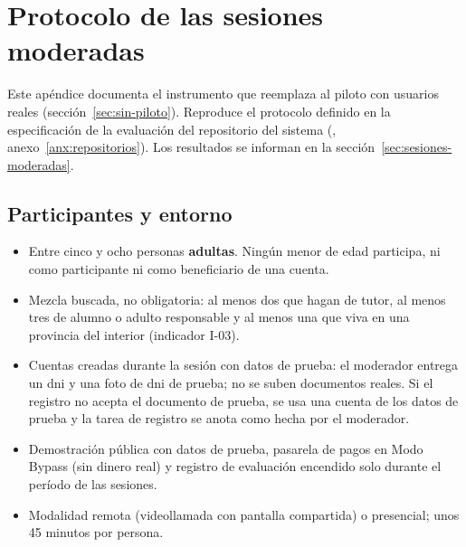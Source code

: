 
\chapter{Protocolo de las sesiones moderadas}\label{apx:sesiones}

Este apéndice documenta el instrumento que reemplaza al piloto con
usuarios reales (sección~\ref{sec:sin-piloto}). Reproduce el protocolo
definido en la especificación de la evaluación del repositorio del
sistema (,
anexo~\ref{anx:repositorios}). Los resultados se informan en la
sección~\ref{sec:sesiones-moderadas}.

\section{Participantes y entorno}

\begin{itemize}
    \item Entre cinco y ocho personas \textbf{adultas}. Ningún menor de
          edad participa, ni como participante ni como beneficiario de
          una cuenta.
    \item Mezcla buscada, no obligatoria: al menos dos que hagan de
          tutor, al menos tres de alumno o adulto responsable y al menos
          una que viva en una provincia del interior (indicador I-03).
    \item Cuentas creadas durante la sesión con datos de prueba: el
          moderador entrega un \gls{dni} y una foto de \gls{dni} de
          prueba; no se suben documentos reales. Si el registro no acepta
          el documento de prueba, se usa una cuenta de los datos de prueba
          y la tarea de registro se anota como hecha por el moderador.
    \item Demostración pública con datos de prueba, pasarela de pagos en
          Modo Bypass (sin dinero real) y registro de evaluación encendido
          solo durante el período de las sesiones.
    \item Modalidad remota (videollamada con pantalla compartida) o
          presencial; unos 45 minutos por persona.
\end{itemize}

